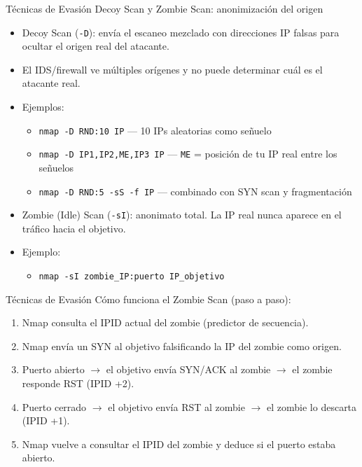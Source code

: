 \documentclass[aspectratio=169,11pt]{beamer}
\begin{document}
\begin{frame}{Técnicas de Evasión}
\small
Decoy Scan y Zombie Scan: anonimización del origen
  \begin{itemize}
  \item Decoy Scan (\verb|-D|): envía el escaneo mezclado con direcciones IP falsas para ocultar el origen real del atacante.
  \item El IDS/firewall ve múltiples orígenes y no puede determinar cuál es el atacante real.
  \item Ejemplos:
    \begin{itemize}
    \item \verb|nmap -D RND:10 IP| --- 10 IPs aleatorias como señuelo
    \item \verb|nmap -D IP1,IP2,ME,IP3 IP| --- \verb|ME| = posición de tu IP real entre los señuelos
    \item \verb|nmap -D RND:5 -sS -f IP| --- combinado con SYN scan y fragmentación
    \end{itemize}
  \item Zombie (Idle) Scan (\verb|-sI|): anonimato total. La IP real nunca aparece en el tráfico hacia el objetivo.
  \item Ejemplo:
    \begin{itemize}
    \item \verb|nmap -sI zombie_IP:puerto IP_objetivo|
    \end{itemize}
  \end{itemize}
\end{frame}


\begin{frame}[allowframebreaks]{Técnicas de Evasión}
  \small
  Cómo funciona el Zombie Scan (paso a paso):
  \begin{enumerate}
  \item Nmap consulta el IPID actual del zombie (predictor de secuencia).
  \item Nmap envía un SYN al objetivo falsificando la IP del zombie como origen.
  \item Puerto abierto $\rightarrow$ el objetivo envía SYN/ACK al zombie $\rightarrow$ el zombie responde RST (IPID +2).
  \item Puerto cerrado $\rightarrow$ el objetivo envía RST al zombie $\rightarrow$ el zombie lo descarta (IPID +1).
  \item Nmap vuelve a consultar el IPID del zombie y deduce si el puerto estaba abierto.
  \end{enumerate}
\end{frame}
\end{document}
